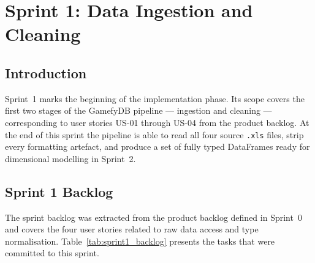 
\chapter{Sprint 1: Data Ingestion and Cleaning}

\section{Introduction}

Sprint~1 marks the beginning of the implementation phase. Its scope covers the
first two stages of the GamefyDB pipeline — ingestion and cleaning — corresponding
to user stories US-01 through US-04 from the product backlog. At the end of this
sprint the pipeline is able to read all four source \texttt{.xls} files, strip
every formatting artefact, and produce a set of fully typed DataFrames ready for
dimensional modelling in Sprint~2.

\section{Sprint 1 Backlog}

The sprint backlog was extracted from the product backlog defined in Sprint~0 and
covers the four user stories related to raw data access and type normalisation.
Table~\ref{tab:sprint1_backlog} presents the tasks that were committed to this sprint.

